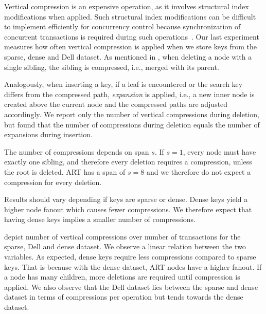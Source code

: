 \documentclass[abstracton,12pt]{scrartcl}
\theoremstyle{definition}
\begin{document}
Vertical compression is an expensive operation, as it involves structural index
modifications when applied. Such structural index modifications can be
difficult to implement efficiently for concurrency control because 
synchronization of concurrent
transactions is required during such operations~\cite{wellenzohn2017wapi}.
Our last experiment measures how often vertical compression is applied
when we store keys from the sparse, dense and Dell dataset.
As mentioned in , when deleting a node with
a single sibling, the sibling is compressed, i.e., merged with its parent.

Analogously, when inserting a key, if a leaf is encountered or the search key
differs from the compressed path, \textit{expansion} is applied, i.e., a new 
inner node is created above the current node and the compressed paths are 
adjusted accordingly. We report only the number of vertical compressions during
deletion, but found that the number of compressions during deletion equals the 
number of expansions during insertion.

The number of compressions
depends on span $s$. If $s=1$, every node must have exactly one sibling,
and therefore every deletion requires a compression, unless the root is
deleted. ART has a span of $s=8$ and we therefore do not expect a compression 
for every deletion.

Results should vary depending if keys are sparse or dense. Dense keys
yield a higher node fanout which causes fewer compressions.
We therefore expect that having dense keys implies a smaller number
of compressions.

depict number of vertical
compressions over number of transactions for the sparse, Dell and dense 
dataset. We observe a linear relation between the two variables. As expected,
dense keys require less compressions compared to sparse keys. That is because
with the dense dataset, ART nodes have a higher fanout. If a node has many children, more
deletions are required until compression is applied.
We also observe that the Dell dataset lies between the sparse and dense
dataset in terms of compressions per operation but tends towards the 
dense dataset.
\end{document}
